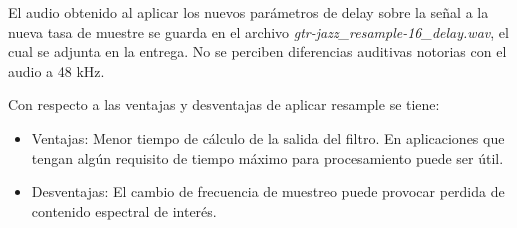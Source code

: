 El audio obtenido al aplicar los nuevos parámetros de delay sobre la señal a la nueva tasa de muestre se guarda en el archivo \textit{gtr-jazz\_resample-16\_delay.wav}, el cual se adjunta en la entrega. No se perciben diferencias auditivas notorias con el audio a 48 kHz.

Con respecto a las ventajas y desventajas de aplicar resample se tiene:
\begin{itemize}
    \item Ventajas: Menor tiempo de cálculo de la salida del filtro. En aplicaciones que tengan algún requisito de tiempo máximo para procesamiento puede ser útil.
    
    \item Desventajas: El cambio de frecuencia de muestreo puede provocar perdida de contenido espectral de interés.
\end{itemize}


